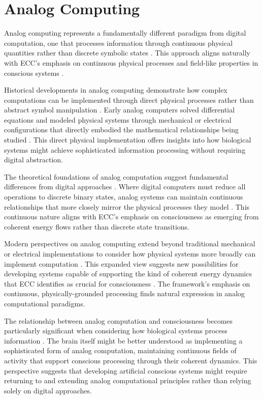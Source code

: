 \section{Analog Computing}

Analog computing represents a fundamentally different paradigm from digital computation, one that processes information through continuous physical quantities rather than discrete symbolic states \cite{Shannon1941}. This approach aligns naturally with ECC's emphasis on continuous physical processes and field-like properties in conscious systems \cite{MacLennan2009}.

Historical developments in analog computing demonstrate how complex computations can be implemented through direct physical processes rather than abstract symbol manipulation \cite{Small2001}. Early analog computers solved differential equations and modeled physical systems through mechanical or electrical configurations that directly embodied the mathematical relationships being studied \cite{Bissell2004}. This direct physical implementation offers insights into how biological systems might achieve sophisticated information processing without requiring digital abstraction.

The theoretical foundations of analog computation suggest fundamental differences from digital approaches \cite{Moore1996}. Where digital computers must reduce all operations to discrete binary states, analog systems can maintain continuous relationships that more closely mirror the physical processes they model \cite{Vergis1986}. This continuous nature aligns with ECC's emphasis on consciousness as emerging from coherent energy flows rather than discrete state transitions.

Modern perspectives on analog computing extend beyond traditional mechanical or electrical implementations to consider how physical systems more broadly can implement computation \cite{Mills2008}. This expanded view suggests new possibilities for developing systems capable of supporting the kind of coherent energy dynamics that ECC identifies as crucial for consciousness \cite{Ulmann2013}. The framework's emphasis on continuous, physically-grounded processing finds natural expression in analog computational paradigms.

The relationship between analog computation and consciousness becomes particularly significant when considering how biological systems process information \cite{vonNeumann1963}. The brain itself might be better understood as implementing a sophisticated form of analog computation, maintaining continuous fields of activity that support conscious processing through their coherent dynamics. This perspective suggests that developing artificial conscious systems might require returning to and extending analog computational principles rather than relying solely on digital approaches.

